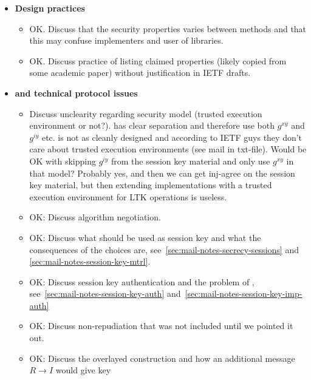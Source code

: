 \documentclass[runningheads,draft]{llncs}
\begin{document}
{\begin{itemize}
        \begin{itemize}
            \item{\textbf{Design practices}}
                \begin{itemize}
                \item OK. Discuss that the security properties varies between methods
                and that this may confuse implementers and user of libraries.
                \item OK. Discuss practice of listing claimed properties (likely copied
                from some academic paper) without justification in IETF drafts.
                \end{itemize}
            \item{\textbf{\mGiy and technical protocol issues}}
                \begin{itemize}
                \item Discuss unclearity regarding security model (trusted execution
                environment or not?). \mOptls has clear separation and therefore
                use both $g^{xy}$ and $g^{iy}$ etc. \mEdhoc{} is not as cleanly
                designed and according to IETF guys they don't care about
                trusted execution environments (see mail in txt-file).
                Would \mEdhoc{} be OK with skipping $g^{iy}$ from the session key
                material and only use $g^{xy}$ in that model? Probably yes, and
                then we can get inj-agree on the session key material, but then
                extending \mEdhoc{} implementations with a trusted execution
                environment for LTK operations is useless.
                \item OK: Discuss algorithm negotiation.
                \item OK: Discuss what should be used as session key and what the
                consequences of the choices are,
                see~\ref{sec:mail-notes-secrecy-sessions} and
                \ref{sec:mail-notes-session-key-mtrl}.
                \item OK: Discuss session key authentication and the problem of \mGiy,
                see~\ref{sec:mail-notes-session-key-auth}
                and~\ref{sec:mail-notes-session-key-imp-auth}
                \item OK: Discuss non-repudiation that was not included until we pointed
                it out.
                \item OK: Discuss the overlayed \mOptls construction and how an
                additional \mOscore message $R \rightarrow I$ would give key

\end{itemize}
\end{itemize}
\end{itemize}}
\end{document}
